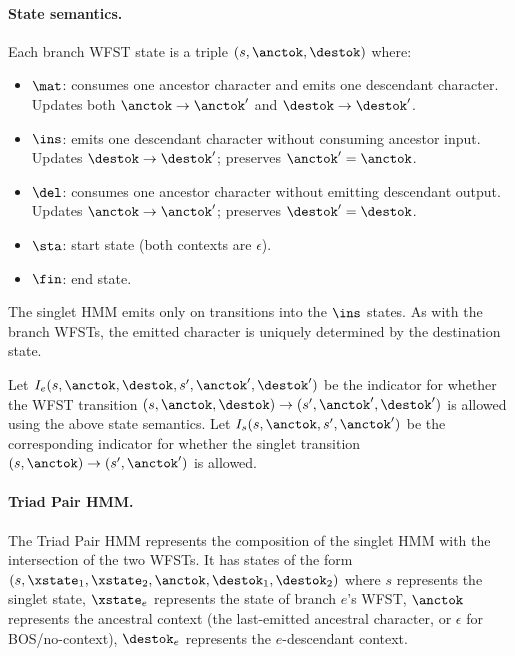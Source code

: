 \paragraph{State semantics.}
Each branch WFST state is a triple $(s, \anctok, \destok)$ where:
\begin{itemize}
\item $\mat$: consumes one ancestor character and emits one descendant character.
  Updates both $\anctok \to \anctok'$ and $\destok \to \destok'$.
\item $\ins$: emits one descendant character without consuming ancestor input.
  Updates $\destok \to \destok'$; preserves $\anctok' = \anctok$.
\item $\del$: consumes one ancestor character without emitting descendant output.
  Updates $\anctok \to \anctok'$; preserves $\destok' = \destok$.
\item $\sta$: start state (both contexts are $\epsilon$).
\item $\fin$: end state.
\end{itemize}
The singlet HMM emits only on transitions into the $\ins$ states. As with the branch WFSTs, the emitted character is uniquely determined by the destination state.

Let $I_e(s, \anctok, \destok, s', \anctok', \destok')$ be the indicator for whether the WFST transition
$(s, \anctok, \destok) \to (s', \anctok', \destok')$ is allowed using the above state semantics.
Let $I_s(s, \anctok, s', \anctok')$ be the corresponding indicator for whether the singlet transition
$(s, \anctok) \to (s', \anctok')$ is allowed.

\paragraph{Triad Pair HMM.}
The Triad Pair HMM represents the composition of the singlet HMM with the intersection of the two WFSTs.
It has states of the form $(s, \xstate_1, \xstate_2, \anctok, \destok_1, \destok_2)$
where $s$ represents the singlet state,
$\xstate_e$ represents the state of branch $e$'s WFST,
$\anctok$ represents the ancestral context (the last-emitted ancestral character, or $\epsilon$ for BOS/no-context),
$\destok_e$ represents the $e$-descendant context.

